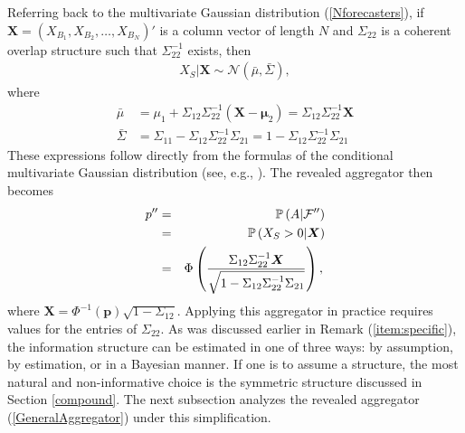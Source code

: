\documentclass[11pt]{article}
\renewcommand{\P}{\mathbb{P}}
\theoremstyle{definition}
\theoremstyle{definition}
\def\one{{\bf 1}}
\def\F{{\cal F}}
\def\P{{\mathbb P}}
\def\probit{p_{\rm probit}}
\begin{document}
Referring back to the multivariate Gaussian distribution
(\ref{Nforecasters}), if $\boldsymbol{X} = (X_{B_1}, X_{B_2}, \dots,
X_{B_N})'$ is a column vector of length $N$ and $\Sigma_{22}$ is a
coherent overlap structure such that $\Sigma_{22}^{-1}$ exists, then
\begin{align*}
X_{S} | \boldsymbol{X} \sim \mathcal{N}\left(\bar{\mu}, \bar{\Sigma}\right), 
\end{align*}
where
\begin{align*}
\bar{\mu} &= \mu_1 + \Sigma_{12} \Sigma_{22}^{-1} 
  (\boldsymbol{X} - \boldsymbol{\mu}_2) 
  = \Sigma_{12} \Sigma_{22}^{-1} \boldsymbol{X} \\
 \bar{\Sigma}&= \Sigma_{11} - \Sigma_{12} \Sigma_{22}^{-1} \Sigma_{21} 
 = 1 - \Sigma_{12} \Sigma_{22}^{-1} \Sigma_{21}   \, 
\end{align*}
These expressions follow directly from the formulas of
the conditional multivariate Gaussian distribution (see, 
e.g., \citealt{ravishanker2001first}). 
The revealed aggregator then becomes
\begin{eqnarray}
p'' & = & \P\left(A  | \F''\right)  \nonumber \\
& = & \P\left(X_{S} > 0 | \boldsymbol{X}\right) \nonumber \\
&=& \Phi\left( \frac{\Sigma_{12} \Sigma_{22}^{-1} \boldsymbol{X}}
   {\sqrt{1 - \Sigma_{12} \Sigma_{22}^{-1} \Sigma_{21}}}\right), 
\label{GeneralAggregator} \,
\end{eqnarray}
 where $\boldsymbol{X} =
\Phi^{-1}(\boldsymbol{p})\sqrt{1-\Sigma_{12}}$. Applying this aggregator in practice requires values for the entries of $\Sigma_{22}$.
As  was discussed earlier in Remark (\ref{item:specific}), the information structure can be estimated in one of three ways: by
assumption, by estimation, or in a Bayesian manner. If one is to
assume a structure, the most natural and non-informative choice is the
symmetric structure discussed in Section \ref{compound}. The next subsection analyzes the revealed aggregator (\ref{GeneralAggregator}) under this simplification.
\end{document}
